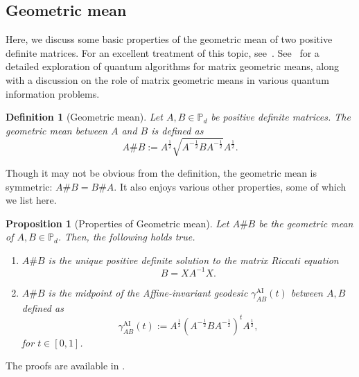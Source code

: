 \documentclass[12pt]{article}
\newtheorem{prop}[theorem]{Proposition}
\newtheorem{definition}[theorem]{Definition}
\theoremstyle{definition}
\begin{document}
\subsection{Geometric mean} \label{App:GeoMean}
Here, we discuss some basic properties of the geometric mean of two positive definite matrices. For an excellent treatment of this topic, see~\cite{bhatia2009positive}. See~\cite{Wilde2024MatrixGeoMean} for a detailed exploration of quantum algorithms for matrix geometric means, along with a discussion on the role of matrix geometric means in various quantum information problems.
\begin{definitionbox}
    \begin{definition}[Geometric mean]
        Let $A, B \in \mathbb P_d$ be positive definite matrices. The geometric mean between $A$ and $B$ is defined as
        \begin{equation}
            A \# B := A ^{\frac12} \sqrt{A ^{-\frac12} B A ^{-\frac12} } A ^{\frac12}.
        \end{equation}
    \end{definition}
\end{definitionbox}
Though it may not be obvious from the definition, the geometric mean is symmetric: $A \# B = B \# A$. It also enjoys various other properties, some of which we list here. 
\begin{theorembox}
    \begin{prop}[Properties of Geometric mean] \label{Prop:GeoMeanPropertiesApp}
        Let $A \# B$ be the geometric mean of $A, B \in \mathbb P_d$. Then, the following holds true.
        \begin{enumerate}
            \item $A \# B$ is the unique positive definite solution to the matrix Riccati equation
            \begin{equation}
                B = X A ^{-1} X.
            \end{equation}
            \item $A\#B$ is the midpoint of the Affine-invariant geodesic $\gamma_{A B}^{\mathrm{AI}}(t)$ between $A,B$ defined as
            \begin{equation}
                \gamma_{A B}^\mathrm{AI}(t) := A ^{\frac12} \left(A ^{-\frac12} B A ^{-\frac12} \right)^t A ^{\frac12},
            \end{equation}
            for $t \in [0,1]$.
        \end{enumerate}
        
    \end{prop}
\end{theorembox}
The proofs are available in \cite{bhatia2009positive}.
\end{document}
